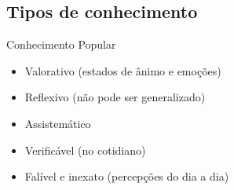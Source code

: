 \documentclass{beamer}
\begin{document}

\subsection{Tipos de conhecimento}



\begin{frame}{Conhecimento Popular}
  \begin{itemize}
  \item Valorativo (estados de ânimo e emoções)
  \item Reflexivo (não pode ser generalizado)
  \item Assistemático
  \item Verificável (no cotidiano)
  \item Falível e inexato (percepções do dia a dia)
  \end{itemize}
\end{frame}
\end{document}
